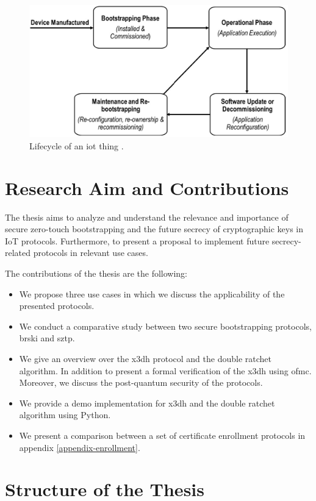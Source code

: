 \begin{figure}[htbp]
	\centering
	\includegraphics[scale=0.35]{Images/iot-lifecycle.jpg}
	\caption{Lifecycle of an \gls{iot} thing \cite{bs-survey}.}
	\label{fig:iot-lifecycle}
\end{figure}

\section{Research Aim and Contributions}\label{sec:reserach_questions}
The thesis aims to analyze and understand the relevance and importance of secure zero-touch bootstrapping and the future secrecy of cryptographic keys in IoT protocols. Furthermore, to present a proposal to implement future secrecy-related protocols in relevant use cases.
\par
The contributions of the thesis are the following:
\begin{itemize}
	\item We propose three use cases in which we discuss the applicability of the presented protocols.
	\item We conduct a comparative study between two secure bootstrapping protocols, \gls{brski} and \gls{sztp}.
	\item We give an overview over the \gls{x3dh} protocol and the double ratchet algorithm. In addition to present a formal verification of the \gls{x3dh} using \gls{ofmc}. Moreover, we discuss the post-quantum security of the protocols.
	\item We provide a demo implementation for \gls{x3dh} and the double ratchet algorithm using Python.
	\item We present a comparison between a set of certificate enrollment protocols in appendix \ref{appendix-enrollment}.
\end{itemize}

\section{Structure of the Thesis}\label{sec:structure_of_the_thesis}


